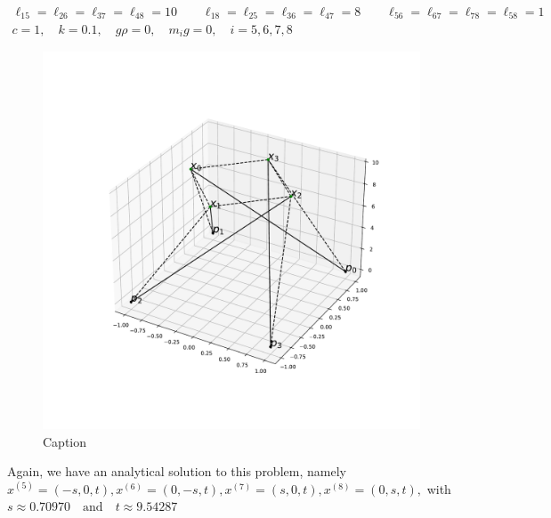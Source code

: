 \begin{equation}
    \begin{gathered}
    \ell_{15} = \ell_{26} = \ell_{37} = \ell_{48} = 10 \qquad \ell_{18} = \ell_{25} = \ell_{36} = \ell_{47} = 8 \qquad \ell_{56} = \ell_{67} = \ell_{78} = \ell_{58} = 1\\
    c=1, \quad k= 0.1, \quad g \rho = 0,\quad m_i g = 0, \quad i = 5,6,7,8
    \end{gathered}
\end{equation}


\begin{figure}
    \centering
    \includegraphics[width=0.6\columnwidth]{Bilder/P69.pdf}
    \caption{Caption}
    \label{P69}
\end{figure}

Again, we have an analytical solution to this problem, namely \\$x^{(5)} = (-s,0,t),x^{(6)} = (0,-s,t),x^{(7)} = (s,0,t),x^{(8)} = (0,s,t), $ with $s \approx 0.70970 \quad \text{and} \quad t \approx 9.54287$